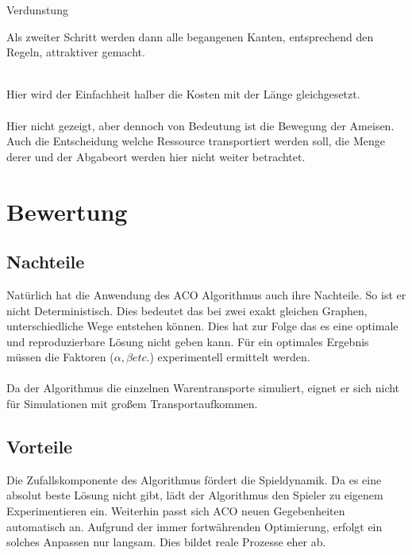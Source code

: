 \documentclass[12pt]{article}
\begin{document}
\begin{algorithm}[H]
\caption{Verdunstung}
\end{algorithm}Als zweiter Schritt werden dann alle begangenen Kanten, entsprechend den Regeln, attraktiver gemacht.\\\\
\begin{algorithm}[H]
\DontPrintSemicolon
{}
\end{algorithm}
Hier wird der Einfachheit halber die Kosten mit der Länge gleichgesetzt.\\\\
Hier nicht gezeigt, aber dennoch von Bedeutung ist die Bewegung der Ameisen. Auch die Entscheidung welche Ressource transportiert werden soll, die Menge derer und der Abgabeort werden hier nicht weiter betrachtet.
\section{Bewertung}
\subsection{Nachteile}\label{Nachteile}
Natürlich hat die Anwendung des ACO Algorithmus auch ihre Nachteile. So ist er nicht Deterministisch. Dies bedeutet das bei zwei exakt gleichen Graphen, unterschiedliche Wege entstehen können.
Dies hat zur Folge das es eine optimale und reproduzierbare Lösung nicht geben kann. Für ein optimales Ergebnis müssen die Faktoren ($\alpha,\beta etc.$) experimentell ermittelt werden.\\\\
Da der Algorithmus die einzelnen Warentransporte simuliert, eignet er sich nicht für Simulationen mit großem Transportaufkommen.
\subsection{Vorteile}
Die Zufallskomponente des Algorithmus fördert die Spieldynamik. Da es eine absolut beste Lösung nicht gibt, lädt der Algorithmus den Spieler zu eigenem Experimentieren ein.
Weiterhin passt sich ACO neuen Gegebenheiten automatisch an. Aufgrund der immer fortwährenden Optimierung, erfolgt ein solches Anpassen nur langsam. Dies bildet reale Prozesse eher ab.
\end{document}
